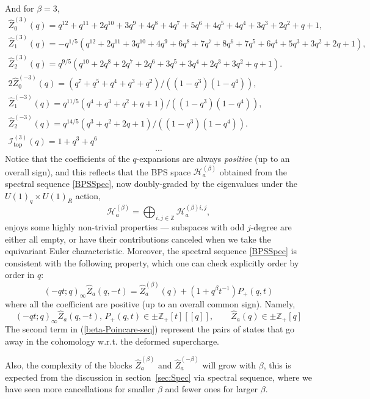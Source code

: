 \documentclass[hyper,letterpaper]{JHEP3}
\newcommand{\be}{\begin{equation}}
\newcommand{\ee}{\end{equation}}
\newcommand{\Z}{{\mathbb Z}}
\renewcommand{\hat}{\widehat}
\def\CH{{\mathcal H}}
\def\CI{{\mathcal I}}
\begin{document}
And	for $\beta=3$,
\begin{equation}
	\begin{array}{c}
	 	\hat{Z}_0^{(3)}(q)=q^{12}+q^{11}+2 q^{10}+3 q^9+4 q^8+4 q^7+5 q^6+4 q^5+4 q^4+3 q^3+2 q^2+q+1,\\	
	 	\hat{Z}_1^{(3)}(q)=-q^{1/5} \left(q^{12}+2 q^{11}+3 q^{10}+4 q^9+6 q^8+7 q^7+8 q^6+7 q^5+6 q^4+5 q^3+3 q^2+2 q+1\right),\\
	 	\hat{Z}_2^{(3)}(q)=q^{9/5}(q^{10}+2 q^8+2 q^7+2 q^6+3 q^5+3 q^4+2 q^3+3 q^2+q+1).
	 	 \\
	2\hat{Z}_0^{(-3)}(q)=(q^7+q^5+q^4+q^3+q^2)/\left((1-q^3)(1-q^4)\right),\\	
	\hat{Z}_1^{(-3)}(q)=q^{11/5} \left(q^4+q^3+q^2+q+1\right)/\left((1-q^3)(1-q^4)\right),\\
	\hat{Z}_2^{(-3)}(q)=q^{14/5} \left(q^3+q^2+2 q+1\right)/\left((1-q^3)(1-q^4)\right).
	 \\
\CI^{(3)}_\text{top}(q)=1+q^3+q^6
	\end{array}
\end{equation}
\begin{equation*}
	\cdots
\end{equation*}
Notice that the coefficients of the $q$-expansions are always \emph{positive} (up to an overall sign), and this reflects that the BPS space $\CH^{(\beta)}_a$ obtained from the spectral sequence \eqref{BPSSpec}, now doubly-graded by the eigenvalues under the $U(1)_q\times U(1)_R$ action,
\be
\CH^{(\beta)}_a=\bigoplus_{i,j\in \Z}\CH^{(\beta)i,j}_a,
\ee
enjoys some highly non-trivial properties --- subspaces with odd $j$-degree are either all empty, or have their contributions canceled when we take the equivariant Euler characteristic. Moreover, the spectral sequence \eqref{BPSSpec} is consistent with the following property, which one can check explicitly order by order in $q$:
\begin{equation}
(-qt;q)_\infty \hat{Z}_a(q,-t) = \hat{Z}_a^{(\beta)}(q)+(1+q^\beta t^{-1})P_+(q,t)
\label{beta-Poincare-seq}
\end{equation}
where all the coefficient are positive (up to an overall common sign). Namely,
\begin{equation}
(-qt;q)_\infty \hat{Z}_a(q,-t),\,P_+(q,t) \in \pm\Z_+[t][[q]],\qquad \hat{Z}_a(q)\in \pm\Z_+[q]
\end{equation}
The second term in (\ref{beta-Poincare-seq}) represent the pairs of states that go away in the cohomology w.r.t. the deformed supercharge.

Also, the complexity of the blocks $\hat{Z}^{(\beta)}_a$ and $\hat{Z}^{(-\beta)}_a$ will grow with $\beta$, this is expected from the discussion in section~\ref{sec:Spec} via spectral sequence, where we have seen more cancellations for smaller $\beta$ and fewer ones for larger $\beta$.
\end{document}
